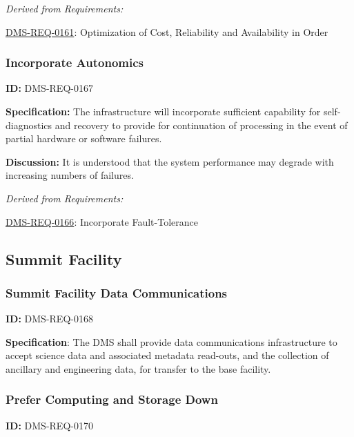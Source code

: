 \documentclass[SE,toc,lsstdraft]{lsstdoc}
\begin{document}
\emph{Derived from Requirements:}

\hyperref[DMS-REQ-0161]{DMS-REQ-0161}:
Optimization of Cost, Reliability and Availability in Order \newline


\subsubsection{Incorporate Autonomics}

\label{DMS-REQ-0167}
\textbf{ID:} DMS-REQ-0167

\textbf{Specification:} The infrastructure will incorporate sufficient capability for self-diagnostics and recovery to provide for continuation of processing in the event of partial hardware or software failures.

\textbf{Discussion: }It is understood that the system performance may degrade with increasing numbers of failures.




\emph{Derived from Requirements:}

\hyperref[DMS-REQ-0166]{DMS-REQ-0166}:
Incorporate Fault-Tolerance \newline


\subsection{Summit Facility}





\subsubsection{Summit Facility Data Communications}

\label{DMS-REQ-0168}
\textbf{ID:} DMS-REQ-0168

\textbf{Specification}: The DMS shall provide data communications infrastructure to accept science data and associated metadata read-outs, and the collection of ancillary and engineering data, for transfer to the base facility.






\subsubsection{Prefer Computing and Storage Down}

\label{DMS-REQ-0170}
\textbf{ID:} DMS-REQ-0170
\end{document}
